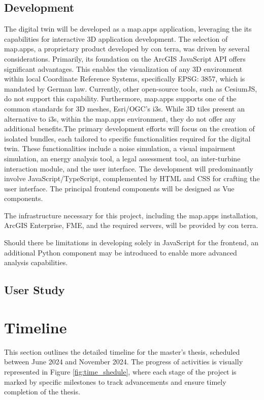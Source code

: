 \documentclass[11pt, titlepage, a4paper]{article}
\begin{document}
\begin{linenumbers}
    \subsection{Development}
    The digital twin will be developed as a map.apps application, leveraging the its capabilities for interactive 3D application development. The selection of map.apps, a proprietary product developed by con terra, was driven by several considerations. Primarily, its foundation on the ArcGIS JavaScript API offers significant advantages. This  enables the visualization of any 3D environment within local Coordinate Reference Systems, specifically EPSG: 3857, which is mandated by German law. Currently, other open-source tools, such as CesiumJS, do not support this capability. Furthermore, map.apps supports one of the common standards for 3D meshes, Esri/OGC's i3s. While 3D tiles present an alternative to i3s, within the map.apps environment, they do not offer any additional benefits.The primary development efforts will focus on the creation of isolated bundles, each tailored to specific functionalities required for the digital twin. These functionalities include a noise simulation, a visual impairment simulation, an energy analysis tool, a legal assessment tool, an inter-turbine interaction module, and the user interface. The development will predominantly involve JavaScript/TypeScript, complemented by HTML and CSS for crafting the user interface. The principal frontend components will be designed as Vue components.

    The infrastructure necessary for this project, including the map.apps installation, ArcGIS Enterprise, FME, and the required servers, will be provided by con terra.

    Should there be limitations in developing solely in JavaScript for the frontend, an additional Python component may be introduced to enable more advanced analysis capabilities.



    \subsection{User Study}
    \section{Timeline}
    This section outlines the detailed timeline for the master's thesis, scheduled between June 2024 and November 2024.
    The progress of activities is visually represented in Figure \ref{fig:time_shedule}, where each stage of the project is marked by specific milestones to track advancements and ensure timely completion of the thesis.


\end{linenumbers}
\end{document}
